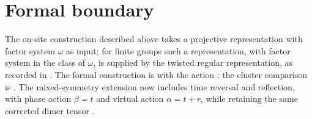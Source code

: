 \documentclass{article}
\begin{document}
\section{Formal boundary}
The on-site construction described above takes a projective representation
with factor system $\omega$ as input; for finite groups
such a representation, with factor system in the class of $\omega$, is supplied by
the twisted regular representation, as recorded in
\cite{gap:rmp_spt_fixed_point_supplied_representation}. The formal construction is
 with the action
; the cluster comparison is
.
The mixed-symmetry extension now includes time reversal and reflection,
with phase action $\beta=t$ and virtual action $\alpha=t+r$, while retaining
the same corrected dimer tensor
\cite{gap:rmp_spt_fixed_point_onsite_scope}.



\end{document}
